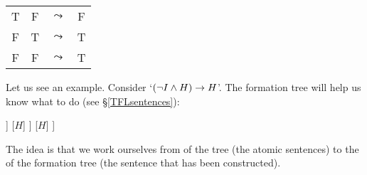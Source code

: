 {\begin{enumerate}
\begin{center}
\begin{tabular}{cccc}
				T & F &$\leadsto$& F\\
				F & T &$\leadsto$& T\\
				F & F &$\leadsto$& T
			\end{tabular}
		\end{center}
	\end{enumerate}
}


Let us see an example. Consider 
`$(\neg I\mathbin{\wedge} H)\rightarrow H$'. 
The formation tree will help us know what to do (see \S\ref{TFLsentences}):
\begin{center}
	\begin{forest}
		[$(\enot I\eand H)\mainconnective{\eif} H$
		[$(\enot I\mainconnective{\eor} H)$
		[$\mainconnective{\enot} I$
		[$I$]
		]
		[$H$]
		]
		[$H$]
		]
	\end{forest}
\end{center}
The idea is that we work ourselves from  of the tree (the atomic sentences) to the  of the formation tree (the sentence that has been constructed). 

%
%		

